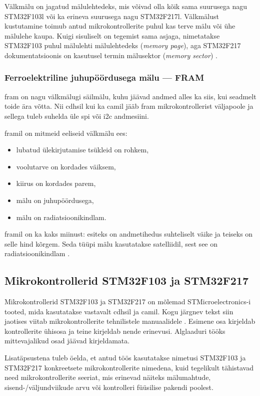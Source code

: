 \documentclass[12pt,a4paper]{article}
\begin{document}
Välkmälu on jagatud mälulehtedeks, mis võivad olla kõik sama suurusega nagu
STM32F103l või ka erineva suurusega nagu STM32F217l. Välkmälust kustutamine
toimub antud mikrokontrollerite puhul kas terve mälu või ühe mälulehe kaupa.
Kuigi sisuliselt on tegemist sama asjaga, nimetatakse STM32F103 puhul mälulehti
mälulehtedeks (\textit{memory page}), aga STM32F217 dokumentatsioonis on
kasutusel termin mälusektor (\textit{memory sector}) \cite{f1fpm,f2fpm}. 

\subsubsection{Ferroelektriline juhupöördusega mälu --- FRAM}
\gls{fram} on nagu välkmälugi säilmälu, kuhu jäävad andmed alles ka siis, kui
seadmelt toide ära võtta. Nii \gls{cdhs}il kui ka \gls{cam}il jääb \gls{fram}
mikrokontrollerist väljapoole ja sellega tuleb suhelda üle \gls{spi} või
\gls{i2c} andmesiini.

\gls{fram}il on mitmeid eeliseid välkmälu ees:
\begin{itemize}
	\item lubatud ülekirjutamise tsükleid on rohkem,
	\item voolutarve on kordades väiksem,
	\item kiirus on kordades parem,
	\item mälu on juhupöördusega,
	\item mälu on radiatsioonikindlam.
\end{itemize}
\Gls{fram}il on ka kaks miinust: esiteks on andmetihedus suhteliselt väike ja
teiseks on selle hind kõrgem. Seda tüüpi mälu kasutatakse satelliidil, sest see
on radiatsioonikindlam \cite{fram}.

\subsection{Mikrokontrollerid STM32F103 ja STM32F217}
\label{sec:mcu}
Mikrokontrollerid STM32F103 ja STM32F217 on mõlemad STMicroelectronics-i tooted,
mida kasutatakse vastavalt \gls{cdhs}il ja \gls{cam}il. Kogu järgnev tekst siin
jaotises viitab mikrokontrollerite tehnilistele manuaalidele \cite{f1rm,f2rm}.
Esimene osa kirjeldab kontrollerite ühisosa ja teine kirjeldab nende
erinevusi. Alglaaduri tööks mittevajalikud osad jäävad kirjeldamata.

Lisatäpsustena tuleb öelda, et antud töös kasutatakse nimetusi STM32F103 ja
STM32F217 konkreetsete mikrokontrollerite nimedena, kuid tegelikult tähistavad
need mikrokontrollerite seeriat, mis erinevad näiteks mälumahtude,
sisend-/väljundviikude arvu või kontrolleri füüsilise pakendi poolest.
\end{document}
